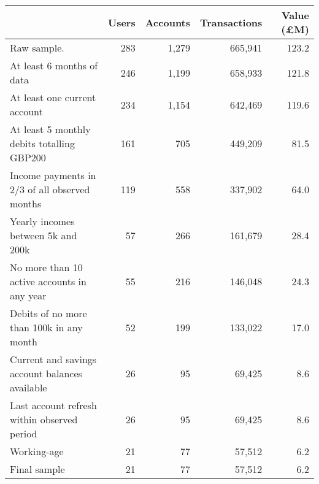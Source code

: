 \begin{tabular}{lrrrr}
\toprule
                                               & Users & Accounts & Transactions & Value (\pounds M) \\
\midrule
                                   Raw sample. &   283 &    1,279 &      665,941 &             123.2 \\
                     At least 6 months of data &   246 &    1,199 &      658,933 &             121.8 \\
                  At least one current account &   234 &    1,154 &      642,469 &             119.6 \\
    At least 5 monthly debits totalling GBP200 &   161 &      705 &      449,209 &              81.5 \\
 Income payments in 2/3 of all observed months &   119 &      558 &      337,902 &              64.0 \\
            Yearly incomes between 5k and 200k &    57 &      266 &      161,679 &              28.4 \\
   No more than 10 active accounts in any year &    55 &      216 &      146,048 &              24.3 \\
      Debits of no more than 100k in any month &    52 &      199 &      133,022 &              17.0 \\
Current and savings account balances available &    26 &       95 &       69,425 &               8.6 \\
   Last account refresh within observed period &    26 &       95 &       69,425 &               8.6 \\
                                   Working-age &    21 &       77 &       57,512 &               6.2 \\
                                  Final sample &    21 &       77 &       57,512 &               6.2 \\
\bottomrule
\end{tabular}
